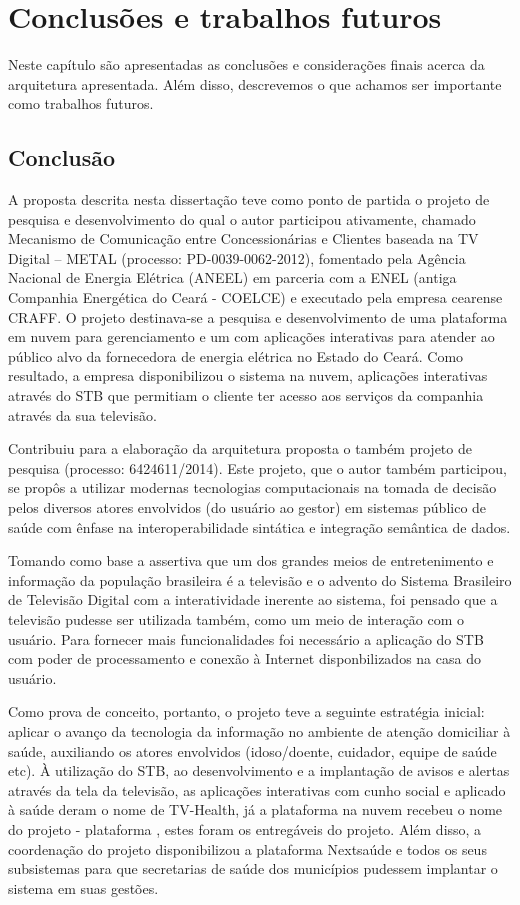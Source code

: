 \chapter{Conclusões e trabalhos futuros} \label{cap:conclusao}

Neste capítulo são apresentadas as conclusões e considerações finais acerca da
arquitetura apresentada. Além disso, descrevemos o que achamos ser importante
como trabalhos futuros.

\section{Conclusão} \label{sec:conclusao}

A proposta descrita nesta dissertação teve como ponto de partida o projeto de
pesquisa e desenvolvimento do qual o autor participou ativamente, chamado
Mecanismo de Comunicação entre Concessionárias e Clientes baseada na TV Digital
– METAL (processo: PD-0039-0062-2012), fomentado pela Agência Nacional de
Energia Elétrica (ANEEL) em parceria com a ENEL (antiga Companhia Energética do
Ceará - COELCE) e executado pela empresa cearense CRAFF. O projeto destinava-se
a pesquisa e desenvolvimento de uma plataforma em nuvem para gerenciamento e um
\stb[] com aplicações interativas para atender ao público alvo da fornecedora de
energia elétrica no Estado do Ceará. Como resultado, a empresa disponibilizou o
sistema na nuvem, aplicações interativas através do STB que permitiam o cliente
ter acesso aos serviços da companhia através da sua televisão.

Contribuiu para a elaboração da arquitetura proposta o também projeto de
pesquisa \nextsaude[] (processo: 6424611/2014). Este projeto, que o autor também
participou, se propôs a utilizar modernas tecnologias computacionais na tomada
de decisão pelos diversos atores envolvidos (do usuário ao gestor) em sistemas
público de saúde com ênfase na interoperabilidade sintática e integração 
semântica de dados.

Tomando como base a assertiva que um dos grandes meios de entretenimento e
informação da população brasileira é a televisão e o advento do Sistema
Brasileiro de Televisão Digital com a interatividade inerente ao sistema, foi
pensado que a televisão pudesse ser utilizada também, como um meio de interação
com o usuário. Para fornecer mais funcionalidades foi necessário a aplicação do
STB com poder de processamento e conexão à Internet disponbilizados na casa do
usuário.   

Como prova de conceito, portanto, o projeto teve a seguinte estratégia inicial:
aplicar o avanço da tecnologia da informação no ambiente de atenção domiciliar
à saúde, auxiliando os atores envolvidos (idoso/doente, cuidador, equipe de
saúde etc). À utilização do STB, ao desenvolvimento e a implantação de avisos e
alertas através da tela da televisão, as aplicações interativas com cunho
social e aplicado à saúde deram o nome de TV-Health, já a plataforma na nuvem
recebeu o nome do projeto - plataforma \nextsaude, estes foram os entregáveis do
projeto. Além disso, a coordenação do projeto disponibilizou a plataforma
Nextsaúde e todos os seus subsistemas para que secretarias de saúde dos
municípios pudessem implantar o sistema em suas gestões.

